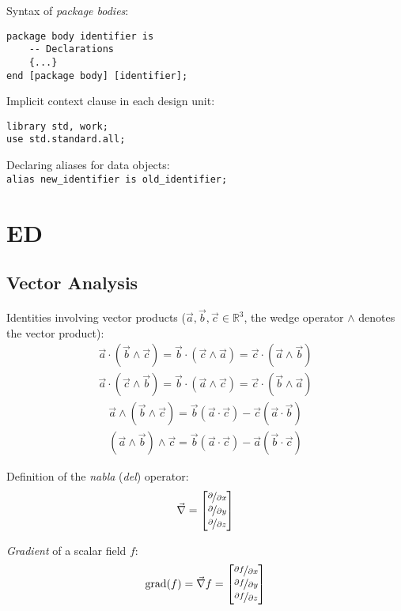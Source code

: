 \documentclass[fontsize=11pt,a4paper]{scrartcl}
\DeclareMathOperator{\grad}{grad}
\begin{document}
Syntax of \emph{package bodies}:
\begin{lstlisting}
package body identifier is
	-- Declarations
	{...}
end [package body] [identifier];
\end{lstlisting}

Implicit context clause in each design unit:
\begin{lstlisting}
library std, work;
use std.standard.all;
\end{lstlisting}

Declaring aliases for data objects:\\ \lstinline!alias new_identifier is old_identifier;!
%
%
%
%
%
\section{ED}
\subsection{Vector Analysis}
Identities involving vector products ($\vec a, \vec b, \vec c\in\mathbb{R}^3$, the wedge operator $\wedge$ denotes the vector product):
\begin{gather*}
	\vec a\cdot(\vec b\wedge\vec c) = \vec b\cdot(\vec c\wedge\vec a) = \vec c\cdot(\vec a\wedge\vec b)\\
	\vec a\cdot(\vec c\wedge\vec b) = \vec b\cdot(\vec a\wedge\vec c) = \vec c\cdot(\vec b\wedge\vec a)
\end{gather*}
\begin{gather*}
	\vec a\wedge(\vec b\wedge\vec c) = \vec b(\vec a\cdot\vec c) - \vec c(\vec a\cdot\vec b)\\
	(\vec a\wedge\vec b)\wedge\vec c = \vec b(\vec a\cdot\vec c) - \vec a(\vec b\cdot\vec c)
\end{gather*}

Definition of the \emph{nabla} (\emph{del}) operator:
\[
	\vec\nabla = \begin{bmatrix}\nicefrac{\partial}{\partial x}\\
	                            \nicefrac{\partial}{\partial y}\\
	                            \nicefrac{\partial}{\partial z}
	             \end{bmatrix}
\]

\emph{Gradient} of a scalar field $f$:
\[
	\grad(f) = \vec\nabla f = \begin{bmatrix}\nicefrac{\partial f}{\partial x}\\
	                                         \nicefrac{\partial f}{\partial y}\\
	                                         \nicefrac{\partial f}{\partial z}
	                          \end{bmatrix}
\]
\end{document}
